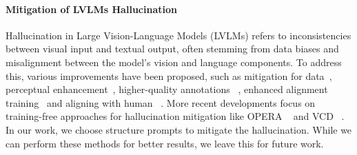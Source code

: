 \paragraph{\textbf{Mitigation of LVLMs Hallucination}}
Hallucination in Large Vision-Language Models (LVLMs) refers to inconsistencies between visual input and textual output, often stemming from data biases and misalignment between the model's vision and language components. To address this, various improvements have been proposed, such as mitigation for data~\cite{hu2023ciemcontrastiveinstructionevaluation,you2023ferretrefergroundgranularity,you2023ferretrefergroundgranularity}, perceptual enhancement~\cite{jain2023vcoderversatilevisionencoders}, higher-quality annotations ~\cite{gunjal2024detectingpreventinghallucinationslarge}, enhanced alignment training~\cite{stiennon2022learningsummarizehumanfeedback, sun2023aligninglargemultimodalmodels} and aligning with human ~\cite{sun2023aligninglargemultimodalmodels,gunjal2024detectingpreventinghallucinationslarge, yu2024rlhfvtrustworthymllmsbehavior}. More recent developments focus on training-free approaches for hallucination mitigation like OPERA ~\cite{huang2024operaalleviatinghallucinationmultimodal} and VCD ~\cite{leng2023mitigatingobjecthallucinationslarge}. In our work, we choose structure prompts to mitigate the hallucination. While we can perform these methods for better results, we leave this for future work.







